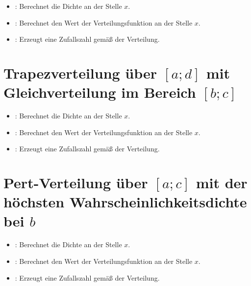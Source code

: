 \begin{itemize}

\item
{}:
Berechnet die Dichte an der Stelle $x$.

\item
{}:
Berechnet den Wert der Verteilungsfunktion an der Stelle $x$.

\item
{}:
Erzeugt eine Zufallszahl gemäß der Verteilung.

\end{itemize}



\section{Trapezverteilung über \texorpdfstring{$[a;d]$}{[a;d]} mit Gleichverteilung im Bereich \texorpdfstring{$[b;c]$}{[b;c]}}

\begin{itemize}

\item
{}:
Berechnet die Dichte an der Stelle $x$.

\item
{}:
Berechnet den Wert der Verteilungsfunktion an der Stelle $x$.

\item
{}:
Erzeugt eine Zufallszahl gemäß der Verteilung.

\end{itemize}



\section{Pert-Verteilung über \texorpdfstring{$[a;c]$}{[a;c]} mit der höchsten Wahrscheinlichkeitsdichte bei \texorpdfstring{$b$}{b}}

\begin{itemize}

\item
{}:
Berechnet die Dichte an der Stelle $x$.

\item
{}:
Berechnet den Wert der Verteilungsfunktion an der Stelle $x$.

\item
{}:
Erzeugt eine Zufallszahl gemäß der Verteilung.

\end{itemize}



